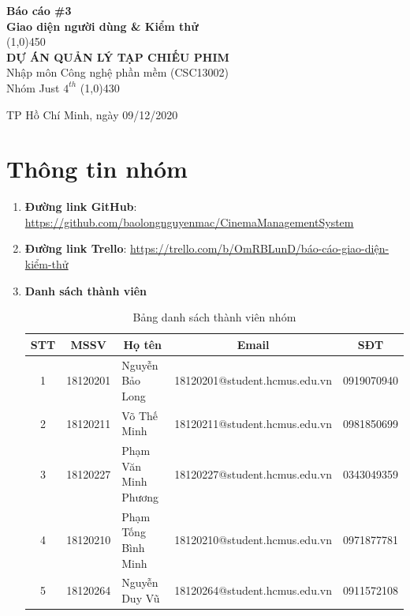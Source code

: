 \documentclass[a4paper, 12pt]{article}
\begin{document}
\begin{titlepage}
	\begin{center}
		\vspace*{1cm}
		\Large\textbf{Báo cáo \#3\\Giao diện người dùng \& Kiểm thử}\\

		\vfill
		\line(1,0){450}\\[4mm]
		\LARGE\textbf{\MakeUppercase{Dự án quản lý tạp chiếu phim}}\\[3mm]
		\Large{Nhập môn Công nghệ phần mềm (CSC13002)}\\[3mm]
		\Large{Nhóm Just $4^{th}$}
		\line(1,0){430}\\
		\vfill

		\vfill
		TP Hồ Chí Minh, ngày 09/12/2020
	\end{center}
\end{titlepage}

\tableofcontents
\thispagestyle{empty}
\clearpage

\section{Thông tin nhóm}
\label{sec:info}
\begin{enumerate}
	\item \textbf{Đường link GitHub}: \url{https://github.com/baolongnguyenmac/CinemaManagementSystem}
	\item \textbf{Đường link Trello}: \url{https://trello.com/b/OmRBLunD/báo-cáo-giao-diện-kiểm-thử}
	\item \textbf{Danh sách thành viên}
	\begin{table}[H]
		\begin{center}
			\begin{tabular}{|c|c|l|c|c|}
				\hline
				STT & MSSV     & \multicolumn{1}{c|}{Họ tên} & Email                         & SĐT        \\ \hline
				1   & 18120201 & Nguyễn Bảo Long             & 18120201@student.hcmus.edu.vn & 0919070940 \\ \hline
				2   & 18120211 & Võ Thế Minh                 & 18120211@student.hcmus.edu.vn & 0981850699 \\ \hline
				3   & 18120227 & Phạm Văn Minh Phương        & 18120227@student.hcmus.edu.vn & 0343049359 \\ \hline
				4   & 18120210 & Phạm Tống Bình Minh         & 18120210@student.hcmus.edu.vn & 0971877781 \\ \hline
				5   & 18120264 & Nguyễn Duy Vũ               & 18120264@student.hcmus.edu.vn & 0911572108 \\ \hline
			\end{tabular}
			\caption{Bảng danh sách thành viên nhóm}
		\end{center}
	\end{table}
\end{enumerate}
\clearpage
\end{document}
